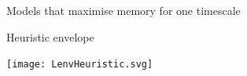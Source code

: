 \documentclass{beamer}%
\begin{document}
\begin{frame}{Models that maximise memory for one timescale}
\begin{center}
 \end{center}
%
%
\end{frame}



\begin{frame}{Heuristic envelope}
%
 \begin{center}
   \texttt{[image: LenvHeuristic.svg]}
 \end{center}
%
%
\end{frame}

\end{document}
